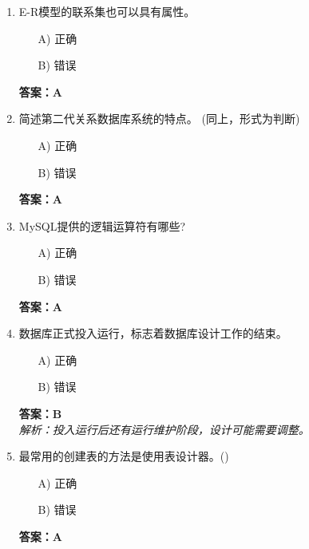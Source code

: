 \documentclass[a4paper,12pt]{article}
\begin{document}
\begin{enumerate}[label=\arabic*.]
\item E-R模型的联系集也可以具有属性。
\begin{itemize}
    \item[A)] 正确
    \item[B)] 错误
\end{itemize}
\textbf{答案：A}

\item 简述第二代关系数据库系统的特点。 (同上，形式为判断)
\begin{itemize}
    \item[A)] 正确
    \item[B)] 错误
\end{itemize}
\textbf{答案：A}

\item MySQL提供的逻辑运算符有哪些?
\begin{itemize}
    \item[A)] 正确
    \item[B)] 错误
\end{itemize}
\textbf{答案：A}

\item 数据库正式投入运行，标志着数据库设计工作的结束。
\begin{itemize}
    \item[A)] 正确
    \item[B)] 错误
\end{itemize}
\textbf{答案：B} \\
\textit{解析：投入运行后还有运行维护阶段，设计可能需要调整。}

\item 最常用的创建表的方法是使用表设计器。()
\begin{itemize}
    \item[A)] 正确
    \item[B)] 错误
\end{itemize}
\textbf{答案：A}

\end{enumerate}
\end{document}
